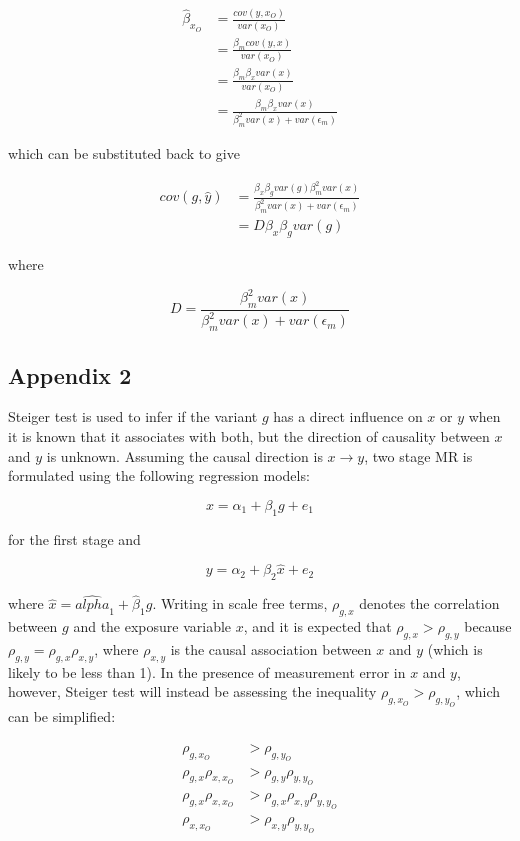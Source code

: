 \documentclass[]{article}
\begin{document}
\[
\begin{aligned}
\hat{\beta}_{x_O} & = \frac{cov(y, x_O)} {var(x_O)} \\
                  & = \frac{\beta_m cov(y, x)} {var(x_O)} \\
                  & = \frac{\beta_m \beta_x var(x)} {var(x_O)} \\
                  & = \frac{\beta_m \beta_x var(x)} {\beta_m^2 var(x) + var(\epsilon_m)}
\end{aligned}
\]

which can be substituted back to give

\[
\begin{aligned}
cov(g, \hat{y}) & = \frac{\beta_x\beta_g var(g) \beta_m^2 var(x)} {\beta_m^2 var(x) + var(\epsilon_m)} \\
                & = D\beta_x\beta_g var(g)
\end{aligned}
\]

where

\[
D = \frac{\beta_m^2 var(x)} {\beta_m^2 var(x) + var(\epsilon_m)}
\]

\subsection{Appendix 2}\label{appendix-2}

Steiger test is used to infer if the variant \(g\) has a direct
influence on \(x\) or \(y\) when it is known that it associates with
both, but the direction of causality between \(x\) and \(y\) is unknown.
Assuming the causal direction is \(x \to y\), two stage MR is formulated
using the following regression models:

\[
x = \alpha_1 + \beta_1 g + e_1
\]

for the first stage and

\[
y = \alpha_2 + \beta_2 \hat{x} + e_2
\]

where \(\hat{x} = \hat{alpha}_1 + \hat{\beta}_1 g\). Writing in scale
free terms, \(\rho_{g, x}\) denotes the correlation between \(g\) and
the exposure variable \(x\), and it is expected that
\(\rho_{g, x} > \rho_{g, y}\) because
\(\rho_{g, y} = \rho_{g, x}\rho_{x, y}\), where \(\rho_{x, y}\) is the
causal association between \(x\) and \(y\) (which is likely to be less
than 1). In the presence of measurement error in \(x\) and \(y\),
however, Steiger test will instead be assessing the inequality
\(\rho_{g, x_O} > \rho_{g, y_O}\), which can be simplified:

\[
\begin{aligned}
\rho_{g, x_O} & > \rho_{g, y_O} \\
\rho_{g, x} \rho_{x, x_O} & > \rho_{g,y}\rho_{y,y_O}\\
\rho_{g, x} \rho_{x, x_O} & > \rho_{g,x}\rho_{x,y}\rho_{y,y_O}\\
\rho_{x, x_O} & > \rho_{x,y}\rho_{y,y_O}
\end{aligned}
\]
\end{document}
